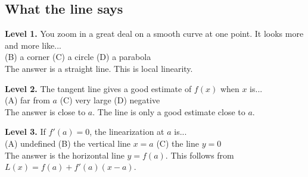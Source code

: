 \documentclass[11pt]{article}
\begin{document}
\subsection*{What the line says}
\noindent\textbf{Level 1.} You zoom in a great deal on a smooth curve at one point. It looks more and more like...\\  \quad (B) a corner \quad (C) a circle \quad (D) a parabola\\  \quad The answer is a straight line. This is local linearity.\par\medskip
\noindent\textbf{Level 2.} The tangent line gives a good estimate of $f(x)$ when $x$ is...\\ (A) far from $a$ \quad {} \quad (C) very large \quad (D) negative\\  \quad The answer is close to $a$. The line is only a good estimate close to $a$.\par\medskip
\noindent\textbf{Level 3.} If $f'(a)=0$, the linearization at $a$ is...\\ (A) undefined \quad (B) the vertical line $x=a$ \quad (C) the line $y=0$ \quad {}\\  \quad The answer is the horizontal line $y=f(a)$. This follows from $L(x)=f(a)+f'(a)(x-a)$.\par\medskip
\end{document}
